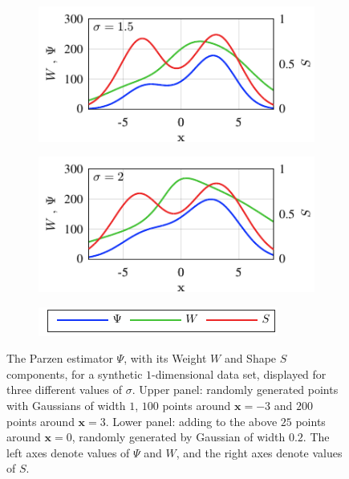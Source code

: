\documentclass[preprint,12pt]{elsarticle}
\begin{document}
\begin{figure}[t]
\begin{subfigure}{.32\linewidth}{\includegraphics[width=1\linewidth]{fig1e.pdf}}\end{subfigure}
\begin{subfigure}{.32\linewidth}{\includegraphics[width=1\linewidth]{fig1f.pdf}}\end{subfigure}
\begin{subfigure}{0.32\linewidth}{\includegraphics[width=1\linewidth]{legend.pdf}}\end{subfigure}
\caption{The Parzen estimator $\Psi$, with its Weight $W$ and Shape $S$ components, for a synthetic $1$-dimensional data set, displayed for three different values of $\sigma$. Upper panel: randomly generated points with Gaussians of width $1$, $100$ points around $\mathbf{x}=-3$ and $200$ points around $\mathbf{x}=3$. Lower panel: adding to the above $25$ points around $\mathbf{x}=0$, randomly generated by Gaussian of width $0.2$. The left axes denote values of $\Psi$ and $W$, and the right axes denote values of $S$.}
\label{1d_example}
\end{figure}
\end{document}

